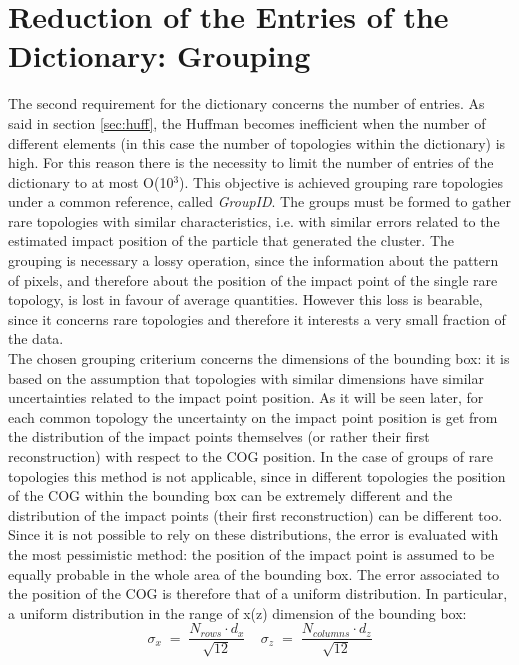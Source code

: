 \section{Reduction of the Entries of the Dictionary: Grouping}
\label{sec:group}
The second requirement for the dictionary concerns the number of entries. As said in section \ref{sec:huff}, the Huffman becomes inefficient when the number of different elements (in this case the number of topologies within the dictionary) is high. For this reason there is the necessity to limit the number of entries of the dictionary to at most O(10$^3$). This objective is achieved grouping rare topologies under a common reference, called \textit{GroupID}. The groups must be formed to gather rare topologies with similar characteristics, i.e. with similar errors related to the estimated impact position of the particle that generated the cluster. The grouping is necessary a lossy operation, since the information about the pattern of pixels, and therefore about the position of the impact point of the single rare topology, is lost in favour of average quantities. However this loss is bearable, since it concerns rare topologies and therefore it interests a very small fraction of the data.\\
The chosen grouping criterium concerns the dimensions of the bounding box: it is based on the assumption that topologies with similar dimensions have similar uncertainties related to the impact point position. As it will be seen later, for each common topology the uncertainty on the impact point position is get from the distribution of the impact points themselves (or rather their first reconstruction) with respect to the COG position. In the case of groups of rare topologies this method is not applicable, since in different topologies the position of the COG within the bounding box can be extremely different and the distribution of the impact points (their first reconstruction) can be different too. Since it is not possible to rely on these distributions, the error is evaluated with the most pessimistic method: the position of the impact point is assumed to be equally probable in the whole area of the bounding box. The error associated to the position of the COG is therefore that of a uniform distribution. In particular, a uniform distribution in the range of x(z) dimension of the bounding box:
\begin{equation}
 \sigma_x \; = \; \frac{N_{rows} \cdot d_x}{\sqrt{12}} \ \ \ \ \  \sigma_z \; = \; \frac{N_{columns} \cdot d_z}{\sqrt{12}}
\end{equation}
